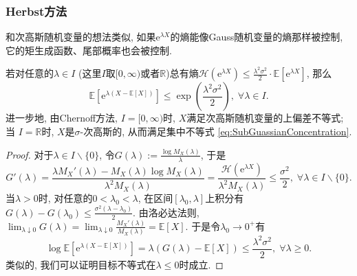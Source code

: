 \subsubsection{Herbst方法}

和次高斯随机变量的想法类似, 如果$\mathrm{e}^{\lambda X}$的熵能像Gauss随机变量的熵那样被控制, 它的矩生成函数、尾部概率也会被控制.
\begin{theorem}[Herbst方法]\label{thm:HerbstArgument}
	若对任意的$\lambda \in I$ (这里$I$取$[0, \infty)$或者$\mathbb{R}$)总有熵$\mathcal{H}(\mathrm{e}^{\lambda X}) \leq \frac{\lambda^2 \sigma^2}{2} \cdot \mathbb{E}[\mathrm{e}^{\lambda X}]$, 那么
	\begin{equation*}
		\mathbb{E}\left[\mathrm{e}^{\lambda(X - \mathbb{E}[X])}\right] 
		\leq \exp \left( \frac{\lambda^2 \sigma^2}{2} \right),\; 
		\forall \lambda \in I. 
	\end{equation*}
	进一步地, 由Chernoff方法, $I = [0, \infty)$时, $X$满足次高斯随机变量的上偏差不等式; 当
	$I = \mathbb{R}$时, $X$是$\sigma$-次高斯的, 从而满足集中不等式 \eqref{eq:SubGuassianConcentration}.
\end{theorem}
\begin{proof}
	对于$\lambda \in I \backslash \{0\}$, 令$G(\lambda) := \frac{\log M_X(\lambda)}{\lambda}$, 于是
	\begin{equation*}
		G'(\lambda) 
		= \frac{\lambda M_X'(\lambda) - M_X(\lambda) \log M_X(\lambda)}{\lambda^2 M_X(\lambda)}
		= \frac{\mathcal{H}(\mathrm{e}^{\lambda X})}{\lambda^2 M_X(\lambda)}
		\leq \frac{\sigma^2}{2},
		\; \forall \lambda \in I \backslash \{0\}. 
	\end{equation*}
	当$\lambda > 0$时, 对任意的$0 < \lambda_0 < \lambda$, 在区间$[\lambda_0, \lambda]$上积分有$G(\lambda) - G(\lambda_0) \leq \frac{\sigma^2 (\lambda - \lambda_0)}{2}$. 
	由洛必达法则, $ \lim_{\lambda \downarrow 0} G(\lambda) = \lim_{\lambda \downarrow 0} \frac{M_X'(\lambda)}{M_X(\lambda)} = \mathbb{E}[X]$. 
	于是令$\lambda_0 \to 0^+$有
	\begin{equation*}
		\log \mathbb{E}\left[\mathrm{e}^{\lambda(X - \mathbb{E}[X])}\right]
		= \lambda(G(\lambda) - \mathbb{E}[X])
		\leq \frac{\lambda^2 \sigma^2}{2} ,\; 
		\forall \lambda \geq 0. 
	\end{equation*}
	类似的, 我们可以证明目标不等式在$\lambda \leq 0$时成立. 
\end{proof}

